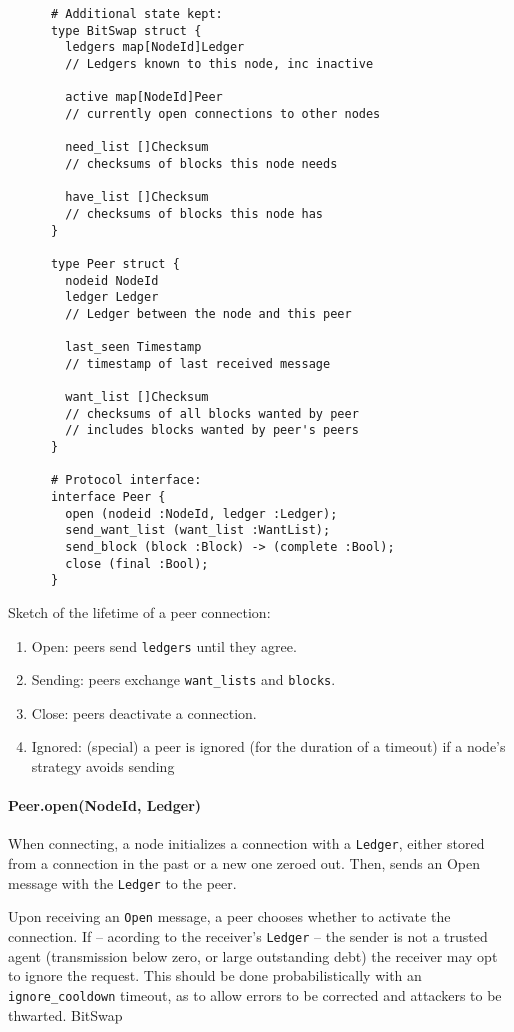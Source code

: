 \documentclass{sig-alternate}
\begin{document}
\begin{verbatim}
      # Additional state kept:
      type BitSwap struct {
        ledgers map[NodeId]Ledger
        // Ledgers known to this node, inc inactive

        active map[NodeId]Peer
        // currently open connections to other nodes

        need_list []Checksum
        // checksums of blocks this node needs

        have_list []Checksum
        // checksums of blocks this node has
      }

      type Peer struct {
        nodeid NodeId
        ledger Ledger
        // Ledger between the node and this peer

        last_seen Timestamp
        // timestamp of last received message

        want_list []Checksum
        // checksums of all blocks wanted by peer
        // includes blocks wanted by peer's peers
      }

      # Protocol interface:
      interface Peer {
        open (nodeid :NodeId, ledger :Ledger);
        send_want_list (want_list :WantList);
        send_block (block :Block) -> (complete :Bool);
        close (final :Bool);
      }
\end{verbatim}


Sketch of the lifetime of a peer connection:
\begin{enumerate}
  \item Open: peers send \texttt{ledgers} until they agree.
  \item Sending: peers exchange \texttt{want\_lists} and \texttt{blocks}.
  \item Close: peers deactivate a connection.
  \item Ignored: (special) a peer is ignored (for the duration of a timeout)
        if a node's strategy avoids sending

\end{enumerate}

\paragraph{Peer.open(NodeId, Ledger)}

When connecting, a node initializes a connection with a
\texttt{Ledger}, either stored from a connection in the past or a new one
zeroed out. Then, sends an Open message with the \texttt{Ledger} to the peer.

Upon receiving an \texttt{Open} message, a peer chooses whether to activate
the connection. If -- acording to the receiver's \texttt{Ledger} -- the sender
is not a trusted agent (transmission below zero, or large outstanding debt) the
receiver may opt to ignore the request. This should be done probabilistically
with an \texttt{ignore\_cooldown} timeout, as to allow errors to be corrected
and attackers to be thwarted. BitSwap
\end{document}

